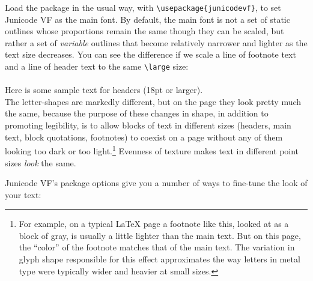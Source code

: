 \documentclass[12pt]{article}
\begin{document}
Load the package in the usual way, with {\color{BrickRed}\verb|\usepackage{junicodevf}|}, to
set Junicode VF as the main font.
By default, the main font is not a set of static outlines whose proportions
remain the same though they can be scaled, but rather a set of
\emph{variable} outlines that become relatively narrower and lighter as the
text size decreases. You can see the difference if we scale a line of footnote
text and a line of header text to the same {\color{BrickRed}\verb|\large|} size:\\[0.5ex]

\\[0.2ex]
{\large\sampleheader Here is some sample text for headers (18pt or larger).}\\[0.5ex]

\noindent The letter-shapes are markedly different, but on the page they look
pretty much the same, because the purpose of these changes in
shape, in addition to promoting legibility,
is to allow blocks of text in different sizes (headers, main text,
block quotations, footnotes) to coexist on a page without any of them looking too
dark or too light.\footnote{%
For example, on a typical LaTeX page a footnote like this, looked at as a block
of gray, is usually a little lighter than the main text. But on this page, the
“color” of the footnote matches that of the main text. The variation in glyph
shape responsible for this effect approximates the way letters in metal type were
typically wider and heavier at small sizes.} Evenness of texture makes text in
different point sizes \emph{look} the same.

Junicode VF's package options give you a number of ways to fine-tune the look of
your text:
\end{document}
